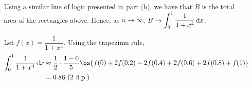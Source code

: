 \documentclass{echw}
\begin{document}
            Using a similar line of logic presented in part (b), we have that $B$ is the total area of the rectangles above. Hence, as $n \to \infty$, $B \to \displaystyle\int_{0}^1 \dfrac1{1 + x^4} \mathop{\mathrm{d}x}$. 
            
            Let $f(x) = \dfrac1{1 + x^4}$. Using the trapezium rule,
            \begin{align*}
                \int_0^1 \dfrac1{1 + x^4} \d x &\approx \dfrac12 \cdot \dfrac{1-0}{5} \bs{f(0) + 2f(0.2) + 2f(0.4) + 2f(0.6) + 2f(0.8) + f(1)}\\
                &= 0.86 \todp{2}
            \end{align*}
            
\end{document}
